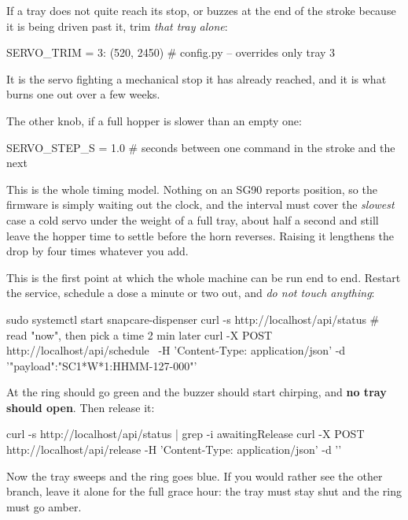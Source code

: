 \documentclass[11pt,a4paper]{article}
\begin{document}
\vspace{1mm}
If a tray does not quite reach its stop, or buzzes at the end of the stroke
because it is being driven past it, trim \emph{that tray alone}:

\begin{pycode}
SERVO_TRIM = {3: (520, 2450)}    # config.py -- overrides only tray 3
\end{pycode}

\begin{warnbox}
It is the servo fighting a mechanical stop it has already reached, and it is
what burns one out over a few weeks.
\end{warnbox}

\noindent The other knob, if a full hopper is slower than an empty one:

\begin{pycode}
SERVO_STEP_S = 1.0     # seconds between one command in the stroke and the next
\end{pycode}

\noindent This is the whole timing model. Nothing on an SG90 reports position,
so the firmware is simply waiting out the clock, and the interval must cover the
\emph{slowest} case \textemdash{} a cold servo under the weight of a full tray,
about half a second \textemdash{} and still leave the hopper time to settle
before the horn reverses. Raising it lengthens the drop by four times whatever
you add.

\vspace{2mm}
\begin{provebox}
\provetitle
This is the first point at which the whole machine can be run end to end.
Restart the service, schedule a dose a minute or two out, and \emph{do not touch
anything}:

\begin{shell}
sudo systemctl start snapcare-dispenser
curl -s http://localhost/api/status      # read "now", then pick a time 2 min later
curl -X POST http://localhost/api/schedule \
     -H 'Content-Type: application/json' -d '{"payload":"SC1*W*1:HHMM-127-000"}'
\end{shell}

\noindent At  the ring should go green and the buzzer should start
chirping, and \textbf{no tray should open}. Then release it:

\begin{shell}
curl -s http://localhost/api/status | grep -i awaitingRelease
curl -X POST http://localhost/api/release -H 'Content-Type: application/json' -d '{}'
\end{shell}

\noindent Now the tray sweeps and the ring goes blue. If you would rather see
the other branch, leave it alone for the full grace hour: the tray must stay
shut and the ring must go amber.
\end{provebox}
\end{document}
